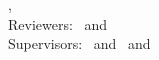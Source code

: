 \newpage\null\thispagestyle{empty}\newpage


\hfill
\vfill
{
	\small
	\textbf{\thesisDegree\ \thesisName} \\
	\textit{\thesisTitle} \\
	\thesisSubject, \thesisDate \\
	Reviewers: \thesisFirstReviewer\ and \thesisSecondReviewer \\
	Supervisors: \thesisFirstSupervisor\ and \thesisSecondSupervisor\ and \thesisThirdSupervisor \\[1.0em]
	\textbf{\thesisOrganization} \\
	\thesisOrganizationDepartment \\
	\textit{\thesisOrganizationGroup} \\
	\thesisOrganizationStreetAddress \\
	\thesisOrganizationPostalCode\ \thesisOrganizationCity \\[1.0em]
	\textbf{\thesisUniversity} \\
	\thesisUniversityDepartment \\
	\thesisUniversityInstitute \\
	\textit{\thesisUniversityGroup} \\
	\thesisUniversityStreetAddress \\
	\thesisUniversityPostalCode\ \thesisUniversityCity
}

